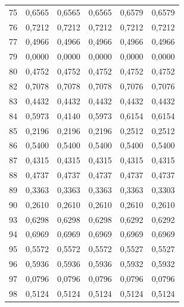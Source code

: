 \begin{center}
\begin{longtable}{c|r|r|r|r|r}
75 & 0,6565 & 0,6565 & 0,6565 & 0,6579 & 0,6579 \\

76 & 0,7212 & 0,7212 & 0,7212 & 0,7212 & 0,7212 \\

77 & 0,4966 & 0,4966 & 0,4966 & 0,4966 & 0,4966 \\

79 & 0,0000 & 0,0000 & 0,0000 & 0,0000 & 0,0000 \\

80 & 0,4752 & 0,4752 & 0,4752 & 0,4752 & 0,4752 \\

82 & 0,7078 & 0,7078 & 0,7078 & 0,7076 & 0,7076 \\

83 & 0,4432 & 0,4432 & 0,4432 & 0,4432 & 0,4432 \\

84 & 0,5973 & 0,4140 & 0,5973 & 0,6154 & 0,6154 \\

85 & 0,2196 & 0,2196 & 0,2196 & 0,2512 & 0,2512 \\

86 & 0,5400 & 0,5400 & 0,5400 & 0,5400 & 0,5400 \\

87 & 0,4315 & 0,4315 & 0,4315 & 0,4315 & 0,4315 \\

88 & 0,4737 & 0,4737 & 0,4737 & 0,4737 & 0,4737 \\

89 & 0,3363 & 0,3363 & 0,3363 & 0,3363 & 0,3303 \\

90 & 0,2610 & 0,2610 & 0,2610 & 0,2610 & 0,2610 \\

93 & 0,6298 & 0,6298 & 0,6298 & 0,6292 & 0,6292 \\

94 & 0,6969 & 0,6969 & 0,6969 & 0,6969 & 0,6969 \\

95 & 0,5572 & 0,5572 & 0,5572 & 0,5527 & 0,5527 \\

96 & 0,5936 & 0,5936 & 0,5936 & 0,5932 & 0,5932 \\

97 & 0,0796 & 0,0796 & 0,0796 & 0,0796 & 0,0796 \\

98 & 0,5124 & 0,5124 & 0,5124 & 0,5124 & 0,5124 \\


\end{longtable}
\end{center}

